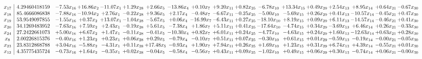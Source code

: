 \documentclass[9pt]{article}
\begin{document}
\[\begin{array}{c| c c@{\hskip 2pt} c@{\hskip 2pt} c@{\hskip 2pt} c@{\hskip 2pt} c@{\hskip 2pt} c@{\hskip 2pt} c@{\hskip 2pt} c@{\hskip 2pt} c@{\hskip 2pt} c@{\hskip 2pt} c@{\hskip 2pt} c@{\hskip 2pt} c@{\hskip 2pt} c@{\hskip 2pt} c@{\hskip 2pt} c@{\hskip 2pt} }
 x_{17}   &  4.29460418159 & -7.53 x_{16} & + 16.86 x_{2} & -11.07 x_{1} & +  1.29 x_{28} & +  2.66 x_{5} & -13.86 x_{4} & +  0.10 x_{7} & +  9.20 x_{11} & +  0.82 x_{25} & -6.78 x_{10} & + 13.34 x_{15} & +  0.49 x_{29} & +  2.54 x_{13} & +  8.95 x_{14} & +  0.64 x_{21} & -0.67 x_{30}\\
 x_{18}   &  85.4666086838 & -7.88 x_{16} & -10.94 x_{2} & +  2.76 x_{1} & -0.22 x_{28} & +  9.36 x_{5} & +  2.17 x_{4} & -0.48 x_{7} & -6.67 x_{11} & -0.25 x_{25} & -5.00 x_{10} & -5.69 x_{15} & +  0.26 x_{29} & +  0.41 x_{13} & -10.57 x_{14} & -0.45 x_{21} & +  0.47 x_{30}\\
 x_{19}   &  53.9549097855 & -1.55 x_{16} & +  0.37 x_{2} & + 13.07 x_{1} & -1.04 x_{28} & -5.67 x_{5} & +  0.06 x_{4} & -16.99 x_{7} & -6.43 x_{11} & +  0.27 x_{25} & -18.10 x_{10} & +  8.19 x_{15} & +  0.09 x_{29} & +  6.11 x_{13} & -14.57 x_{14} & -0.46 x_{21} & +  0.41 x_{30}\\
 x_{20}   &  34.1269483952 & -7.63 x_{16} & +  7.59 x_{2} & +  2.43 x_{1} & -0.19 x_{28} & +  5.61 x_{5} & -7.38 x_{4} & +  1.86 x_{7} & +  5.11 x_{11} & +  0.41 x_{25} & -17.64 x_{10} & -4.74 x_{15} & +  0.34 x_{29} & -3.69 x_{13} & +  6.46 x_{14} & +  0.26 x_{21} & -0.33 x_{30}\\
 x_{24}   &  27.2422661073 & +  5.00 x_{16} & +  6.67 x_{2} & +  1.47 x_{1} & -0.11 x_{28} & -0.41 x_{5} & -10.30 x_{4} & +  0.82 x_{7} & +  6.01 x_{11} & +  0.24 x_{25} & -4.77 x_{10} & -4.63 x_{15} & +  0.24 x_{29} & +  1.60 x_{13} & -12.63 x_{14} & +  0.63 x_{21} & +  0.28 x_{30}\\
 x_{8}   &  2.00226815376 & -0.40 x_{16} & +  1.23 x_{2} & +  0.23 x_{1} & +  0.06 x_{28} & +  0.29 x_{5} & -0.79 x_{4} & -0.10 x_{7} & +  0.51 x_{11} & +  0.07 x_{25} & -0.30 x_{10} & +  0.61 x_{15} & +  0.01 x_{29} & -0.59 x_{13} & -0.19 x_{14} & -0.00 x_{21} & -0.05 x_{30}\\
 x_{23}   &  23.8312868788 & +  3.04 x_{16} & -5.88 x_{2} & -4.31 x_{1} & +  0.11 x_{28} & + 17.48 x_{5} & -0.93 x_{4} & +  1.90 x_{7} & +  7.94 x_{11} & +  0.26 x_{25} & +  1.69 x_{10} & +  1.23 x_{15} & +  0.31 x_{29} & +  6.74 x_{13} & +  4.39 x_{14} & -0.55 x_{21} & +  0.01 x_{30}\\
 x_{12}   &  4.35775435724 & -0.73 x_{16} & +  1.64 x_{2} & -0.35 x_{1} & +  0.02 x_{28} & -0.04 x_{5} & -0.58 x_{4} & -0.56 x_{7} & +  0.43 x_{11} & +  0.09 x_{25} & -1.02 x_{10} & +  0.49 x_{15} & +  0.06 x_{29} & +  0.30 x_{13} & -0.74 x_{14} & +  0.06 x_{21} & -0.00 x_{30}\\

\end{array}\]
\end{document}
